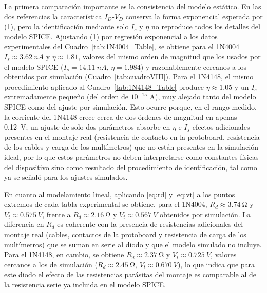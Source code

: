 \documentclass[journal,a4paper]{IEEEtran}
\begin{document}
La primera comparación importante es la consistencia del modelo estático. En las dos referencias la característica $I_D$-$V_D$ conserva la forma exponencial esperada por (1), pero la identificación mediante solo $I_s$ y $\eta$ no reproduce todos los detalles del modelo SPICE. Ajustando (1) por regresión exponencial a los datos experimentales del Cuadro~\ref{tab:1N4004_Table}, se obtiene para el 1N4004 $I_s\approx\SI{3.62}{nA}$ y $\eta\approx1.81$, valores del mismo orden de magnitud que los usados por el modelo SPICE ($I_s=\SI{14.11}{nA}$, $\eta=1.984$) y razonablemente cercanos a los obtenidos por simulación (Cuadro~\ref{tab:cuadroVIII}). Para el 1N4148, el mismo procedimiento aplicado al Cuadro~\ref{tab:1N4148_Table} produce $\eta\approx1.05$ y un $I_s$ extremadamente pequeño (del orden de $10^{-15}$ A), muy alejado tanto del modelo SPICE como del ajuste por simulación. Esto ocurre porque, en el rango medido, la corriente del 1N4148 crece cerca de dos órdenes de magnitud en apenas \SI{0.12}{V}; un ajuste de solo dos parámetros absorbe en $\eta$ e $I_s$ efectos adicionales presentes en el montaje real (resistencia de contacto en la protoboard, resistencia de los cables y carga de los multímetros) que no están presentes en la simulación ideal, por lo que estos parámetros no deben interpretarse como constantes físicas del dispositivo sino como resultado del procedimiento de identificación, tal como ya se señaló para los ajustes simulados.

En cuanto al modelamiento lineal, aplicando \eqref{eq:rd} y \eqref{eq:vt} a los puntos extremos de cada tabla experimental se obtiene, para el 1N4004, $R_d\approx\SI{3.74}{\ohm}$ y $V_t\approx\SI{0.575}{V}$, frente a $R_d\approx\SI{2.16}{\ohm}$ y $V_t\approx\SI{0.567}{V}$ obtenidos por simulación. La diferencia en $R_d$ es coherente con la presencia de resistencias adicionales del montaje real (cables, contactos de la protoboard y resistencia de carga de los multímetros) que se suman en serie al diodo y que el modelo simulado no incluye. Para el 1N4148, en cambio, se obtiene $R_d\approx\SI{2.37}{\ohm}$ y $V_t\approx\SI{0.725}{V}$, valores cercanos a los de simulación ($R_d\approx\SI{2.45}{\ohm}$, $V_t\approx\SI{0.670}{V}$), lo que indica que para este diodo el efecto de las resistencias parásitas del montaje es comparable al de la resistencia serie ya incluida en el modelo SPICE.
\end{document}
